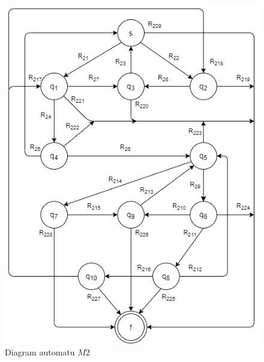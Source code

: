 \begin{figure}[!ht]
\centering
\includegraphics[scale =0.7]{obrazky-figures/M2.jpg}
\caption{Diagram automatu $M2$}
\label{M2obr}
\end{figure}

\newpage

